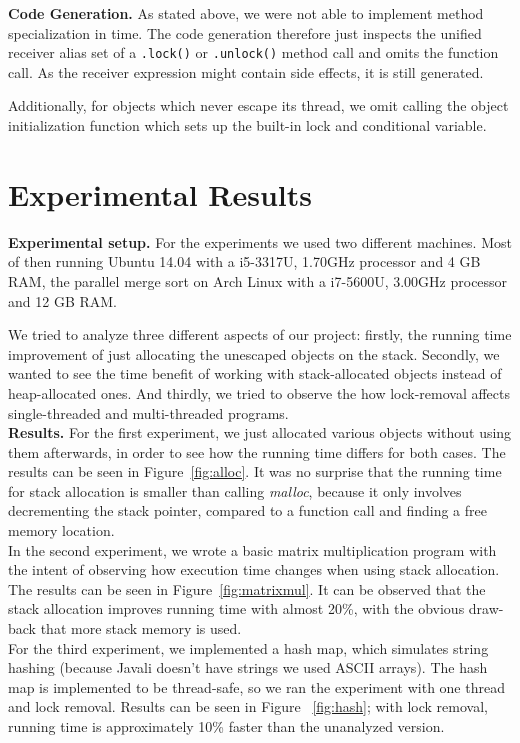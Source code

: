\documentclass[letterpaper]{article}
\newcommand{\mypar}[1]{{\bf #1.}}
\begin{document}
\mypar{Code Generation}
As stated above, we were not able to implement method specialization in time. The code generation
therefore just inspects the unified receiver alias set of a \texttt{.lock()} or  \texttt{.unlock()} method
call and omits the function call. As the receiver expression might contain side effects, it
is still generated.

Additionally, for objects which never escape its thread, we omit calling the object initialization
function which sets up the built-in lock and conditional variable.

\section{Experimental Results}\label{sec:exp}

\mypar{Experimental setup} For the experiments we used two different machines. Most of then running
Ubuntu 14.04 with a i5-3317U, 1.70GHz processor and 4 GB RAM, the parallel merge sort
on Arch Linux with a i7-5600U, 3.00GHz processor and 12 GB RAM.

We tried to analyze three different aspects of our project: firstly, the running time improvement of just allocating
the unescaped objects on the stack. Secondly, we wanted to see the time benefit of working with stack-allocated
objects instead of heap-allocated ones. And thirdly, we tried to observe the how lock-removal affects single-threaded
and multi-threaded programs.\\

\mypar{Results}
For the first experiment, we just allocated various objects without using them afterwards, in order to see how the running time differs
for both cases. The results can be seen in Figure~\ref{fig:alloc}. It was no surprise that the running time for stack allocation is smaller than calling \textit{malloc}, because it only involves decrementing the stack pointer, compared to a function call and finding a free memory location.\\

In the second experiment, we wrote a basic matrix multiplication program with the intent of observing how execution time changes when using
stack allocation. The results can be seen in Figure~\ref{fig:matrixmul}. It can be observed that the stack allocation improves running
time with almost 20\%, with the obvious draw-back that more stack memory is used.\\

For the third experiment, we implemented a hash map, which simulates string hashing (because Javali doesn't have strings we used ASCII arrays).
The hash map is implemented to be thread-safe, so we ran the experiment with one thread and lock removal. Results can be seen in Figure~
\ref{fig:hash}; with lock removal, running time is approximately 10\% faster than the unanalyzed version.\\
\end{document}
